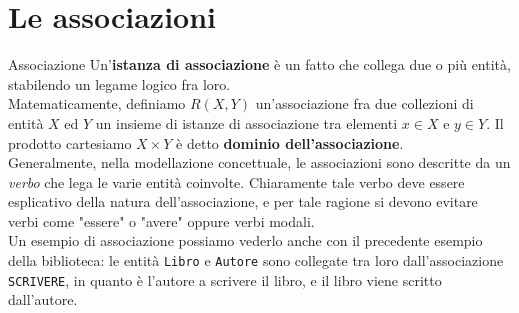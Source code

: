 \documentclass[12pt]{report}
\begin{document}
	\section{Le associazioni}
	\begin{definizione}{Associazione}{}
		Un'\textbf{istanza di associazione} è un fatto che collega due o più entità, stabilendo un legame logico fra loro.\\
		Matematicamente, definiamo $R(X, Y)$ un'associazione fra due collezioni di entità $X$ ed $Y$ un insieme di istanze di associazione tra elementi $x \in X$ e $y \in Y$. Il prodotto cartesiamo $X \times Y$ è detto \textbf{dominio dell'associazione}.\\
		\smallbreak
		Generalmente, nella modellazione concettuale, le associazioni sono descritte da un \textit{verbo} che lega le varie entità coinvolte. Chiaramente tale verbo deve essere esplicativo della natura dell'associazione, e per tale ragione si devono evitare verbi come "essere" o "avere" oppure verbi modali.\\
		Un esempio di associazione possiamo vederlo anche con il precedente esempio della biblioteca: le entità \texttt{Libro} e \texttt{Autore} sono collegate tra loro dall'associazione \texttt{SCRIVERE}, in quanto è l'autore a scrivere il libro, e il libro viene scritto dall'autore.
	\end{definizione}
	
\end{document}
